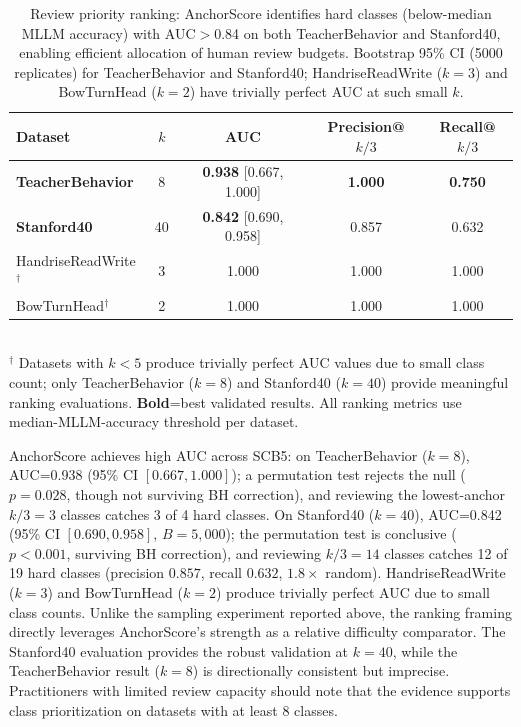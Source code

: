 \documentclass[a4paper,fleqn]{cas-sc}
\begin{document}
\begin{table}[t]
\caption{Review priority ranking: AnchorScore identifies hard classes (below-median MLLM accuracy) with AUC$>$0.84 on both TeacherBehavior and Stanford40, enabling efficient allocation of human review budgets. Bootstrap 95\% CI (5000 replicates) for TeacherBehavior and Stanford40; HandriseReadWrite ($k=3$) and BowTurnHead ($k=2$) have trivially perfect AUC at such small $k$.}
\label{tab:ranking}
\centering
\footnotesize
\begin{tabular}{lcccc}
\toprule
\textbf{Dataset} & $k$ & \textbf{AUC} & \textbf{Precision@$k/3$} & \textbf{Recall@$k/3$} \\
\midrule
\textbf{TeacherBehavior} & 8 & \textbf{0.938} [0.667, 1.000] & \textbf{1.000} & \textbf{0.750} \\
\textbf{Stanford40} & 40 & \textbf{0.842} [0.690, 0.958] & 0.857 & 0.632 \\
HandriseReadWrite$^\dagger$ & 3 & 1.000 & 1.000 & 1.000 \\
BowTurnHead$^\dagger$ & 2 & 1.000 & 1.000 & 1.000 \\
\bottomrule
\end{tabular}
\\[4pt]
\footnotesize{$^\dagger$ Datasets with $k<5$ produce trivially perfect AUC values due to small class count; only TeacherBehavior ($k=8$) and Stanford40 ($k=40$) provide meaningful ranking evaluations. \textbf{Bold}=best validated results. All ranking metrics use median-MLLM-accuracy threshold per dataset.}
\end{table}

AnchorScore achieves high AUC across SCB5: on TeacherBehavior ($k=8$), AUC=0.938 (95\% CI $[0.667, 1.000]$); a permutation test rejects the null ($p=0.028$, though not surviving BH correction), and reviewing the lowest-anchor $k/3=3$ classes catches 3 of 4 hard classes. On Stanford40 ($k=40$), AUC=0.842 (95\% CI $[0.690, 0.958]$, $B=5{,}000$); the permutation test is conclusive ($p<0.001$, surviving BH correction), and reviewing $k/3=14$ classes catches 12 of 19 hard classes (precision $0.857$, recall $0.632$, $1.8\times$ random). HandriseReadWrite ($k=3$) and BowTurnHead ($k=2$) produce trivially perfect AUC due to small class counts.
Unlike the sampling experiment reported above, the ranking framing directly leverages AnchorScore's strength as a relative difficulty comparator. The Stanford40 evaluation provides the robust validation at $k=40$, while the TeacherBehavior result ($k=8$) is directionally consistent but imprecise. Practitioners with limited review capacity should note that the evidence supports class prioritization on datasets with at least 8 classes.
\end{document}
